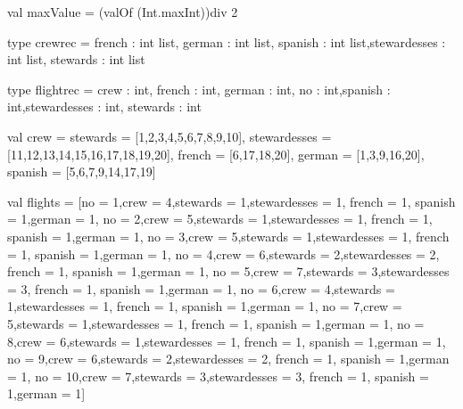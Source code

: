 \documentclass[a4paper,halfparskip]{scrartcl}
\begin{document}
\begin{myverbatim}
val maxValue = (valOf (Int.maxInt))div 2

type crewrec = {french : int list, german : int list,
                spanish : int list,stewardesses : int list, 
                stewards : int list}
                
type flightrec = {crew : int, french : int, german : int,
                  no : int,spanish : int,stewardesses : int,
                  stewards : int}
                  
val crew = {stewards = [1,2,3,4,5,6,7,8,9,10],
            stewardesses = [11,12,13,14,15,16,17,18,19,20],
            french = [6,17,18,20],
            german = [1,3,9,16,20],
            spanish = [5,6,7,9,14,17,19]}
     
val flights = [{no = 1,crew = 4,stewards = 1,stewardesses = 1,
                french = 1, spanish = 1,german = 1},
               {no = 2,crew = 5,stewards = 1,stewardesses = 1,
               french = 1, spanish = 1,german = 1},
               {no = 3,crew = 5,stewards = 1,stewardesses = 1,
               french = 1, spanish = 1,german = 1},
               {no = 4,crew = 6,stewards = 2,stewardesses = 2,
               french = 1, spanish = 1,german = 1},
               {no = 5,crew = 7,stewards = 3,stewardesses = 3,
               french = 1, spanish = 1,german = 1},
               {no = 6,crew = 4,stewards = 1,stewardesses = 1,
               french = 1, spanish = 1,german = 1},
               {no = 7,crew = 5,stewards = 1,stewardesses = 1,
               french = 1, spanish = 1,german = 1},
               {no = 8,crew = 6,stewards = 1,stewardesses = 1,
               french = 1, spanish = 1,german = 1},
               {no = 9,crew = 6,stewards = 2,stewardesses = 2,
               french = 1, spanish = 1,german = 1},
               {no = 10,crew = 7,stewards = 3,stewardesses = 3,
               french = 1, spanish = 1,german = 1}]


\end{myverbatim}
\end{document}
